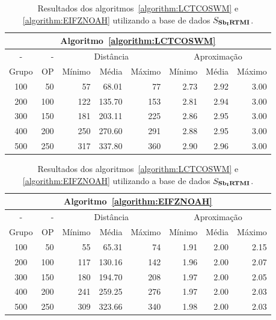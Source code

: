 \begin{table}[!htb]
  \caption{Resultados dos algoritmos~\ref{algorithm:LCTCOSWM} e \ref{algorithm:EIFZNOAH} utilizando a base de dados $S_{\textbf{Sb\textsubscript{I}RTMI}}{}$.}
  \label{table:FTGAXJEH}
  \centering
  \begin{tabular}{|c|r|r|r|r|r|r|r|}
    \hline
    \multicolumn{8}{|c|}{Algoritmo~\ref{algorithm:LCTCOSWM}}                                                  \\ \hline
      -      &  -   & \multicolumn{3}{c|}{Distância}             & \multicolumn{3}{c|}{Aproximação}           \\ \hline
    Grupo    & OP   & Mínimo       & Média        & Máximo       & Mínimo       & Média        & Máximo       \\ \hline  
    100      & 50   & 57           & 68.01        & 77           & 2.73         & 2.92         & 3.00         \\ \hline
    200      & 100  & 122          & 135.70       & 153          & 2.81         & 2.94         & 3.00         \\ \hline
    300      & 150  & 181          & 203.11       & 225          & 2.86         & 2.95         & 3.00         \\ \hline
    400      & 200  & 250          & 270.60       & 291          & 2.88         & 2.95         & 3.00         \\ \hline
    500      & 250  & 317          & 337.80       & 360          & 2.90         & 2.96         & 3.00         \\ \hline    
  \end{tabular}

  \vspace{5mm}

  \begin{tabular}{|c|r|r|r|r|r|r|r|}
    \hline
    \multicolumn{8}{|c|}{Algoritmo~\ref{algorithm:EIFZNOAH}}                                                  \\ \hline
      -      &  -   & \multicolumn{3}{c|}{Distância}             & \multicolumn{3}{c|}{Aproximação}           \\ \hline
    Grupo    & OP   & Mínimo       & Média        & Máximo       & Mínimo       & Média        & Máximo       \\ \hline  
    100      & 50   & 55           & 65.31        & 74           & 1.91         & 2.00         & 2.15         \\ \hline
    200      & 100  & 117          & 130.16       & 142          & 1.96         & 2.00         & 2.07         \\ \hline
    300      & 150  & 180          & 194.70       & 208          & 1.97         & 2.00         & 2.05         \\ \hline
    400      & 200  & 241          & 259.25       & 276          & 1.97         & 2.00         & 2.03         \\ \hline
    500      & 250  & 309          & 323.66       & 340          & 1.98         & 2.00         & 2.03         \\ \hline    
  \end{tabular}
\end{table}